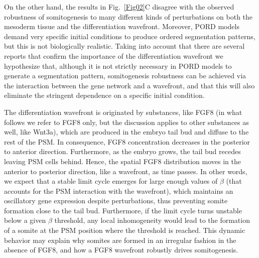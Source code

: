 \documentclass[%
 preprint,
 amsmath,amssymb,
 aps,
]{revtex4-2}
\begin{document}
	On the other hand, the results in Fig.~\ref{Fig02}C disagree with the observed 
	robustness of somitogenesis to many different kinds of perturbations on both the 
	mesoderm tissue and the differentiation wavefront. Moreover, PORD models demand very 
	specific initial conditions to produce ordered segmentation patterns, but this is not 
	biologically realistic. Taking into account that there are several reports that confirm 
	the importance of the differentiation wavefront \citep{Sawada2001, Naiche2011} we 
	hypothesize that, although it is not strictly necessary in PORD models to generate 
	a segmentation pattern, somitogenesis robustness can be achieved via the interaction
	between the gene network and a wavefront, and that this will also eliminate 
	the stringent dependence on a specific initial condition. 
	
	The differentiation wavefront is originated by 
	substances, like FGF8 (in what follows we refer to FGF8 only, but the
	discussion applies to other substances as well, like Wnt3a), which are produced in the
	embryo tail bud and diffuse to the rest of the PSM. In consequence, FGF8
	concentration decreases in the posterior to anterior direction. Furthermore, 
	as the embryo grows, the tail bud recedes leaving PSM cells behind. Hence,
	the spatial FGF8 distribution moves in the anterior to posterior direction, like
	a wavefront, as time passes. In other words, we expect that a stable limit cycle 
	emerges for large
	enough values of $\beta$ (that accounts for the PSM interaction with the
	wavefront), which maintains an oscillatory gene expression despite perturbations, 
	thus preventing somite formation close to the tail bud. Furthermore, if the limit
	cycle turns unstable below a given $\beta$ threshold, any local inhomogeneity would
	lead to the formation of a somite at the PSM position where the threshold is
	reached. This dynamic behavior may explain why somites are formed in an
	irregular fashion in the absence of FGF8, and how a FGF8 wavefront robustly
	drives somitogenesis.
	
\end{document}
